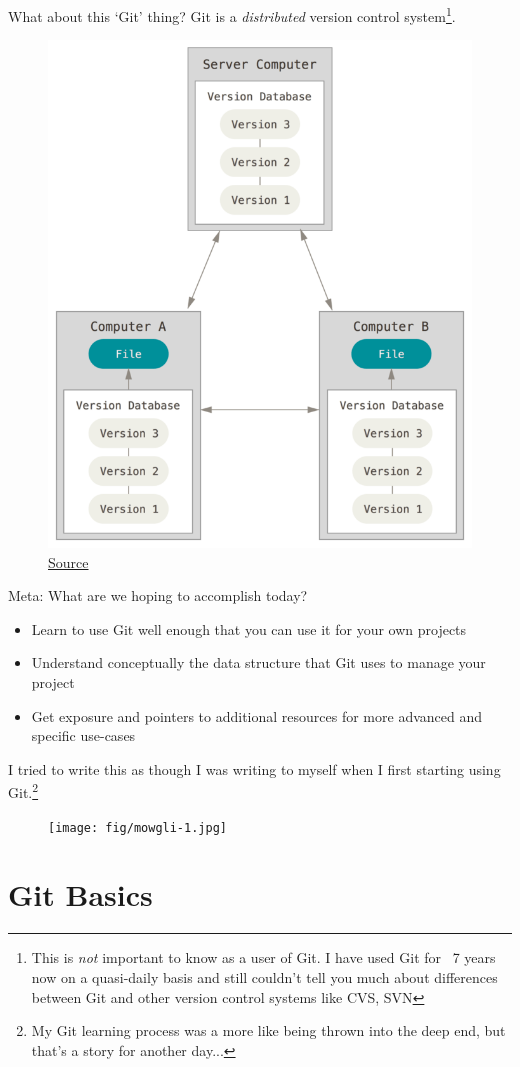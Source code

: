 \documentclass[pdf]{beamer} %
\begin{document}
\begin{frame}[t]{What about this `Git' thing?}
    Git is a \emph{distributed} version control system\footnote{This is \emph{not} important to know as a user of Git. I have used Git for ~7 years now on a quasi-daily basis and still couldn't tell you much about differences between Git and other version control systems like CVS, SVN}.

    \begin{figure}[htpb]
        \centering
        \includegraphics[width=0.3\linewidth]{fig/git-summary.png}
        \caption{\href{https://git-scm.com/book/en/v2/Getting-Started-About-Version-Control}{Source}}
        \label{fig:git_summary}
    \end{figure}
\end{frame}

\begin{frame}[t]{Meta: What are we hoping to accomplish today?}
    \begin{itemize}
        \item Learn to use Git well enough that you can use it for your own projects
        \item Understand conceptually the data structure that Git uses to manage your project
        \item Get exposure and pointers to additional resources for more advanced and specific use-cases
    \end{itemize}

    I tried to write this as though I was writing to myself when I first starting using Git.\footnote{My Git learning process was a more like being thrown into the deep end, but that's a story for another day...}

    \begin{figure}[htpb]
        \centering
        \texttt{[image: fig/mowgli-1.jpg]}
        \label{fig:fig/mowgli-1}
    \end{figure}
\end{frame}

\section{Git Basics}
\end{document}
